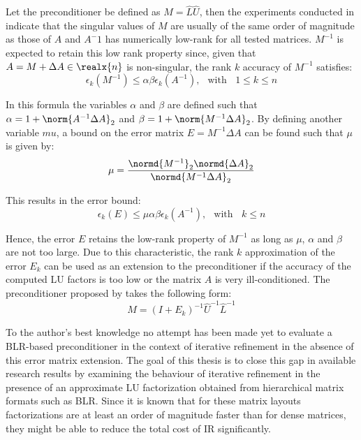 \noindent Let the preconditioner be defined as $M=\hat{L}\hat{U}$, then the experiments conducted in \cite{higham_new_2019} indicate that the singular values of $M$ are usually of the same order of magnitude as those of $A$ and $A^-1$ has numerically low-rank for all tested matrices. $M^{-1}$ is expected to retain this low rank property since, given that $A=M+\Delta A \in \realx{n}$ is non-singular, the rank $k$ accuracy of $M^{-1}$ satisfies:
\begin{equation}
    \epsilon_k(M^{-1}) \leq \alpha\beta\epsilon_k(A^{-1})\text{,} \;\; \text{ with } \;\; 1\leq k \leq n
\end{equation}

\noindent In this formula the variables $\alpha$ and $\beta$ are defined such that $\alpha=1+\norm{A^{-1}\Delta A}_2$ and $\beta=1+\norm{M^{-1}\Delta A}_2$. By defining another variable $mu$, a bound on the error matrix $E=M^{-1}\Delta A$ can be found such that $\mu$ is given by:
\begin{equation}
    \mu=\frac{\normd{M^{-1}}_2\normd{\Delta A}_2}{\normd{M^{-1}\Delta A}_2}
\end{equation}

\noindent This results in the error bound:
\begin{equation}
    \epsilon_k(E) \leq \mu\alpha\beta\epsilon_k(A^{-1})\text{,} \;\; \text{ with } \;\; k \leq n
\end{equation}

\noindent Hence, the error $E$ retains the low-rank property of $M^{-1}$ as long as $\mu$, $\alpha$ and $\beta$ are not too large. Due to this characteristic, the rank $k$ approximation of the error $E_k$ can be used as an extension to the preconditioner if the accuracy of the computed LU factors is too low or the matrix $A$ is very ill-conditioned. The preconditioner proposed by \cite{higham_new_2019} takes the following form:
\begin{equation}
    M = (I + E_k)^{-1}\hat{U}^{-1}\hat{L}^{-1}
\end{equation}

\noindent To the author's best knowledge no attempt has been made yet to evaluate a BLR-based preconditioner in the context of iterative refinement in the absence of this error matrix extension. The goal of this thesis is to close this gap in available research results by examining the behaviour of iterative refinement in the presence of an approximate LU factorization obtained from hierarchical matrix formats such as BLR. Since it is known that for these matrix layouts factorizations are at least an order of magnitude faster than for dense matrices, they might be able to reduce the total cost of IR significantly.